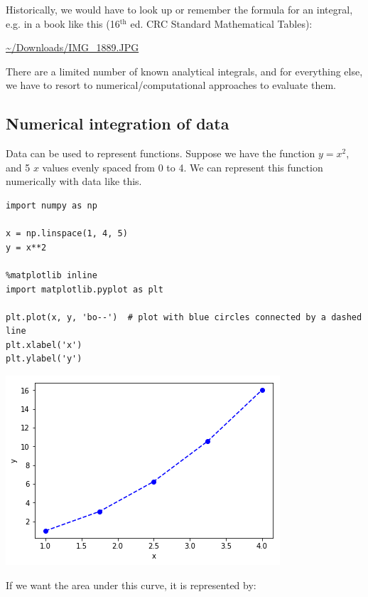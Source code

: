 \documentclass[11pt]{article}
\begin{document}
Historically, we would have to look up or remember the formula for an integral, e.g. in a book like this (16\(^{\text{th}}\) ed. CRC Standard Mathematical Tables):

\url{\~/Downloads/IMG\_1889.JPG}

There are a limited number of known analytical integrals, and for everything else, we have to resort to numerical/computational approaches to evaluate them.



\subsection{Numerical integration of data}
\label{sec:org7cb1cff}

Data can be used to represent functions. Suppose we have the function \(y=x^2\), and 5 \(x\) values evenly spaced from 0 to 4. We can represent this function numerically with data like this.

\begin{verbatim}
import numpy as np

x = np.linspace(1, 4, 5)
y = x**2

%matplotlib inline
import matplotlib.pyplot as plt

plt.plot(x, y, 'bo--')  # plot with blue circles connected by a dashed line
plt.xlabel('x')
plt.ylabel('y')
\end{verbatim}

\begin{center}
\includegraphics[width=.9\linewidth]{obipy-resources/d9632b07b477acbf48eabd2bf122330e-49561Tnc.png}
\end{center}

If we want the area under this curve, it is represented by:
\end{document}
